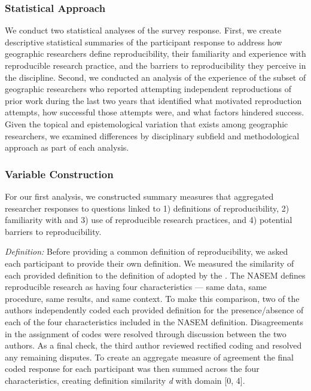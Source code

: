\documentclass[]{interact}
\theoremstyle{plain}%
\theoremstyle{definition}
\theoremstyle{remark}
\begin{document}
\subsubsection*{Statistical Approach}
We conduct two statistical analyses of the survey response.
First, we create descriptive statistical summaries of the participant response to address how geographic researchers define reproducibility, their familiarity and experience with reproducible research practice, and the barriers to reproducibility they perceive in the discipline.
Second, we conducted an analysis of the experience of the subset of geographic researchers who reported attempting independent reproductions of prior work during the last two years that identified what motivated reproduction attempts, how successful those attempts were, and what factors hindered success.
Given the topical and epistemological variation that exists among geographic researchers, we examined differences by disciplinary subfield and methodological approach as part of each analysis.

\subsubsection*{Variable Construction}
For our first analysis, we constructed summary measures that aggregated researcher responses to questions linked to 1) definitions of reproducibility, 2) familiarity with and 3) use of reproducible research practices, and 4) potential barriers to reproducibility. 

\textit{Definition:} Before providing a common definition of reproducibility, we asked each participant to provide their own definition.
We measured the similarity of each provided definition to the definition of adopted by the \citet{NASEM2019}. 
The NASEM defines reproducible research as having four characteristics --- same data, same procedure, same results, and same context.
To make this comparison, two of the authors independently coded each provided definition for the presence/absence of each of the four characteristics included in the NASEM definition.
Disagreements in the assignment of codes were resolved through discussion between the two authors. 
As a final check, the third author reviewed rectified coding and resolved any remaining disputes.
To create an aggregate measure of agreement the final coded response for each participant was then summed across the four characteristics, creating definition similarity \textit{d} with domain [0, 4].
\end{document}
